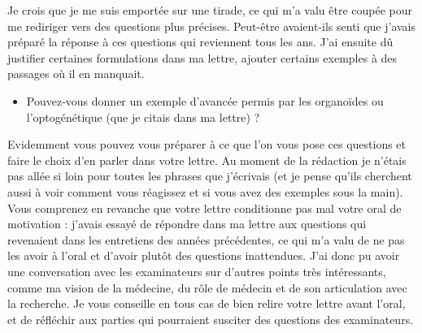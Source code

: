 Je crois que je me suis emportée sur une tirade, ce qui m’a valu être coupée pour me rediriger vers des questions plus précises. Peut-être avaient-ils senti que j’avais préparé la réponse à ces questions qui reviennent tous les ans. J’ai ensuite dû justifier certaines formulations dans ma lettre, ajouter certains exemples à des passages où il en manquait. 

\begin{itemize}
\item Pouvez-vous donner un exemple d’avancée permis par les organoïdes ou l’optogénétique (que je citais dans ma lettre) ? 
\end{itemize}

Evidemment vous pouvez vous préparer à ce que l’on vous pose ces questions et faire le choix d’en parler dans votre lettre. Au moment de la rédaction je n’étais pas allée si loin pour toutes les phrases que j’écrivais (et je pense qu’ils cherchent aussi à voir comment vous réagissez et si vous avez des exemples sous la main). Vous comprenez en revanche que votre lettre conditionne pas mal votre oral de motivation : j’avais essayé de répondre dans ma lettre aux questions qui revenaient dans les entretiens des années précédentes, ce qui m’a valu de ne pas les avoir à l’oral et d’avoir plutôt des questions inattendues. J’ai donc pu avoir une conversation avec les examinateurs sur d’autres points très intéressants, comme ma vision de la médecine, du rôle de médecin et de son articulation avec la recherche. Je vous conseille en tous cas de bien relire votre lettre avant l’oral, et de réfléchir aux parties qui pourraient susciter des questions des examinateurs. 

\newpage